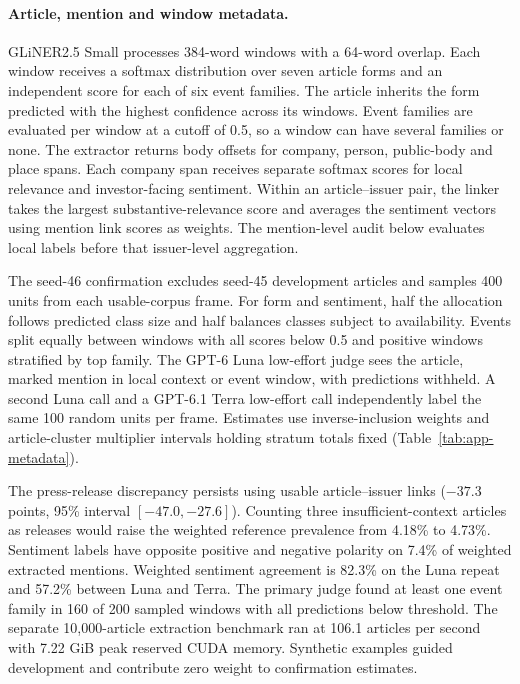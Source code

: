 \paragraph{Article, mention and window metadata.}
GLiNER2.5 Small processes 384-word windows with a 64-word overlap.
Each window receives a softmax distribution over seven article forms
and an independent score for each of six event families. The article
inherits the form predicted with the highest confidence across its
windows. Event families are evaluated per window at a cutoff of 0.5,
so a window can have several families or none. The extractor returns
body offsets for company, person, public-body and place spans. Each
company span receives separate softmax scores for local relevance and
investor-facing sentiment. Within an article--issuer pair, the linker
takes the largest substantive-relevance score and averages the sentiment
vectors using mention link scores as weights. The mention-level audit below
evaluates local labels before that issuer-level aggregation.

The seed-46 confirmation excludes seed-45 development articles and
samples 400 units from each usable-corpus frame. For form and sentiment,
half the allocation follows predicted class size and half balances
classes subject to availability. Events split equally between windows
with all scores below 0.5 and positive windows stratified by top family.
The GPT-6 Luna low-effort judge sees the article, marked mention in
local context or event window, with predictions withheld. A second Luna
call and a GPT-6.1 Terra low-effort call independently label the same
100 random units per frame. Estimates use inverse-inclusion weights
and article-cluster multiplier intervals holding stratum totals fixed
(Table~\ref{tab:app-metadata}).

The press-release discrepancy persists using usable article--issuer links
($-37.3$ points, 95\% interval $[-47.0,-27.6]$). Counting three
insufficient-context articles as releases would raise the weighted
reference prevalence from 4.18\% to 4.73\%. Sentiment labels have opposite
positive and negative polarity on 7.4\% of weighted extracted mentions.
Weighted sentiment agreement is 82.3\% on the Luna repeat and 57.2\%
between Luna and Terra. The primary judge found at least one event
family in 160 of 200 sampled windows with all predictions below threshold.
The separate 10,000-article extraction benchmark ran at 106.1 articles
per second with 7.22 GiB peak reserved CUDA memory. Synthetic examples
guided development and contribute zero weight to confirmation estimates.

